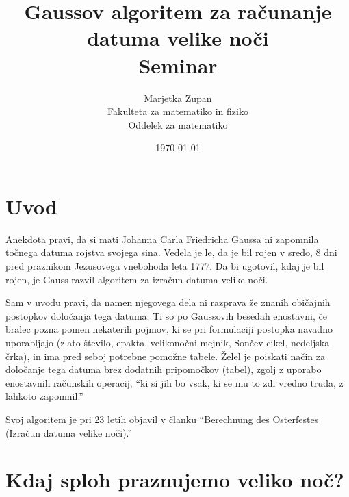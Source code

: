\documentclass[a4paper,12pt]{article}
\title{Gaussov algoritem za računanje datuma velike noči \\ 
\Large Seminar}
\author{Marjetka Zupan \\
Fakulteta za matematiko in fiziko \\
Oddelek za matematiko}
\date{\today}
\begin{document}


\maketitle
\begin{abstract}
\end{abstract}




\section{Uvod}

Anekdota pravi, da si mati Johanna Carla Friedricha Gaussa ni zapomnila 
točnega datuma rojstva svojega sina. Vedela je le, da je bil rojen v sredo, 
8 dni pred praznikom Jezusovega vnebohoda leta 1777. Da bi ugotovil, kdaj 
je bil rojen, je Gauss razvil algoritem za izračun datuma velike noči. 

Sam v uvodu pravi, da namen njegovega dela ni razprava že znanih običajnih postopkov določanja
tega datuma. Ti so po Gaussovih besedah enostavni, če bralec pozna pomen 
nekaterih pojmov, ki se pri formulaciji postopka navadno uporabljajo 
(zlato število, epakta, velikonočni mejnik, Sončev cikel, nedeljska črka), 
in ima pred seboj potrebne pomožne tabele.
Želel je poiskati način za določanje tega datuma brez dodatnih pripomočkov 
(tabel), zgolj z uporabo enostavnih računskih operacij, ``ki si jih bo vsak, 
ki se mu to zdi vredno truda, z lahkoto zapomnil.'' \cite{gauss} 

Svoj algoritem je pri 23 letih objavil v članku ``Berechnung des Osterfestes 
(Izračun datuma velike noči).'' \cite{gauss}



\section{Kdaj sploh praznujemo veliko noč?} %
\end{document}
